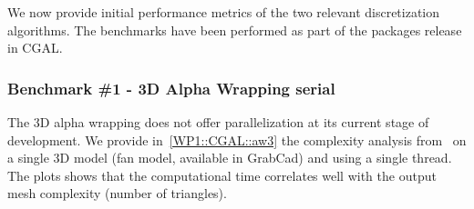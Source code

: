 We now provide initial performance metrics of the two relevant discretization algorithms. The benchmarks have been performed as part of the packages release in CGAL.



\subsubsection{Benchmark \#1 - 3D Alpha Wrapping serial}


The 3D alpha wrapping does not offer parallelization at its current stage of development. We provide in~\cref{WP1::CGAL::aw3} the complexity analysis from~\cite{portaneri_alpha_2022} on a single 3D model (fan model, available in GrabCad) and using a single thread. 
The plots shows that the computational time correlates well with the output mesh complexity (number of triangles).


